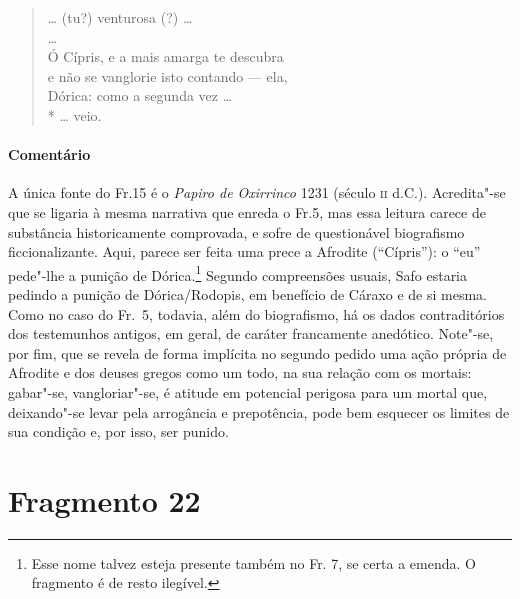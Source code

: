 \begin{verse}
\ldots{} (tu?) venturosa (?) \ldots{}\\ 
\ldots{}\\
Ó Cípris, e a mais amarga te descubra\\
e não se vanglorie isto contando --- ela,\\
Dórica: como a segunda vez \ldots{}\\*
\ldots{} veio.
\end{verse}

{\paragraph{Comentário} A única fonte do Fr.15 é o \textit{Papiro de Oxirrinco} 1231 (século \textsc{ii} d.C.).
Acredita"-se que se ligaria à mesma narrativa que enreda o Fr.5, mas essa
leitura carece de substância historicamente comprovada, e sofre de
questionável biografismo ficcionalizante. Aqui,
parece ser feita uma prece a Afrodite (“Cípris”): o “eu” pede"-lhe a
punição de Dórica.\footnote{Esse nome talvez esteja presente também no Fr. 7, se certa a emenda. O fragmento é de resto ilegível.} Segundo compreensões usuais, Safo estaria pedindo a punição
de Dórica/Rodopis, em benefício de Cáraxo e de si mesma. Como no caso do Fr.~5,
todavia, além do biografismo, há os dados contraditórios dos testemunhos
antigos, em geral, de caráter francamente anedótico. Note"-se, por fim, que se
revela de forma implícita no segundo pedido uma ação própria de Afrodite e dos
deuses gregos como um todo, na sua relação com os mortais: gabar"-se,
vangloriar"-se, é atitude em potencial perigosa para um mortal que,
deixando"-se levar pela arrogância e prepotência, pode bem esquecer
os limites de sua condição e, por isso, ser punido.}

\pagebreak


\section{Fragmento 22}

